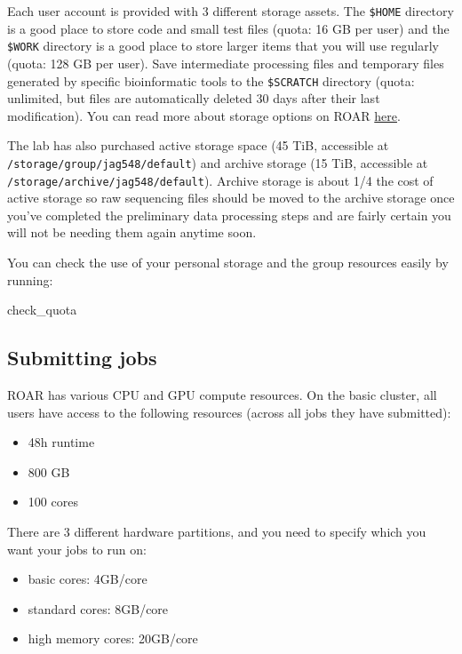 \documentclass[
]{book}
\newenvironment{Shaded}{\begin{snugshade}}{\end{snugshade}}
\newcommand{\NormalTok}[1]{#1}
\providecommand{\tightlist}{%
  \setlength{\itemsep}{0pt}\setlength{\parskip}{0pt}}
\begin{document}
Each user account is provided with 3 different storage assets. The \texttt{\$HOME} directory is a good place to store code and small test files (quota: 16 GB per user) and the \texttt{\$WORK} directory is a good place to store larger items that you will use regularly (quota: 128 GB per user). Save intermediate processing files and temporary files generated by specific bioinformatic tools to the \texttt{\$SCRATCH} directory (quota: unlimited, but files are automatically deleted 30 days after their last modification). You can read more about storage options on ROAR \href{https://docs.icds.psu.edu/handling-data/file-storage/}{here}.

The lab has also purchased active storage space (45 TiB, accessible at \texttt{/storage/group/jag548/default}) and archive storage (15 TiB, accessible at \texttt{/storage/archive/jag548/default}). Archive storage is about 1/4 the cost of active storage so raw sequencing files should be moved to the archive storage once you've completed the preliminary data processing steps and are fairly certain you will not be needing them again anytime soon.

You can check the use of your personal storage and the group resources easily by running:

\begin{Shaded}
\begin{Highlighting}[]
\NormalTok{check\_quota}
\end{Highlighting}
\end{Shaded}

\subsection{Submitting jobs}\label{submitting-jobs}

ROAR has various CPU and GPU compute resources. On the basic cluster, all users have access to the following resources (across all jobs they have submitted):

\begin{itemize}
\tightlist
\item
  48h runtime
\item
  800 GB
\item
  100 cores
\end{itemize}

There are 3 different hardware partitions, and you need to specify which you want your jobs to run on:

\begin{itemize}
\tightlist
\item
  basic cores: 4GB/core
\item
  standard cores: 8GB/core
\item
  high memory cores: 20GB/core
\end{itemize}
\end{document}
